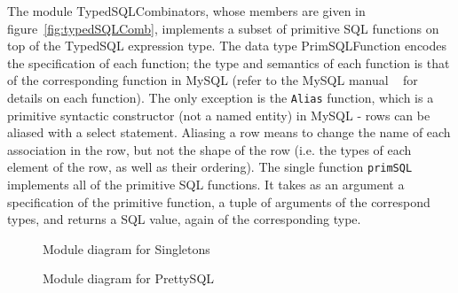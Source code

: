 
The module TypedSQLCombinators, whose members are given in 
figure~\ref{fig:typedSQLComb},
implements a subset of primitive SQL functions on top of the TypedSQL 
expression type. 
The data type PrimSQLFunction encodes the specification of each 
function; the type
and semantics of each function is that of the corresponding function in 
MySQL (refer to
the MySQL manual ~\cite{mySQLman} for details on each function). The 
only exception
is the \lstinline{Alias} function, which is a primitive syntactic 
constructor (not a named entity)
in MySQL - rows can be aliased with a select statement. Aliasing a row 
means to change
the name of each association in the row, but not the shape of the row 
(i.e. the types of
each element of the row, as well as their ordering). The single 
function \lstinline{primSQL}
implements all of the primitive SQL functions. It takes as an argument 
a specification
of the primitive function, a tuple of arguments of the correspond 
types, and returns
a SQL value, again of the corresponding type. 



\begin{figure}[!ht]
\caption{Module diagram for Singletons} \label{fig:singletons}
\end{figure}

\begin{figure}[!ht]
\caption{Module diagram for PrettySQL} 
    \label{fig:prettySQL}
\end{figure}



